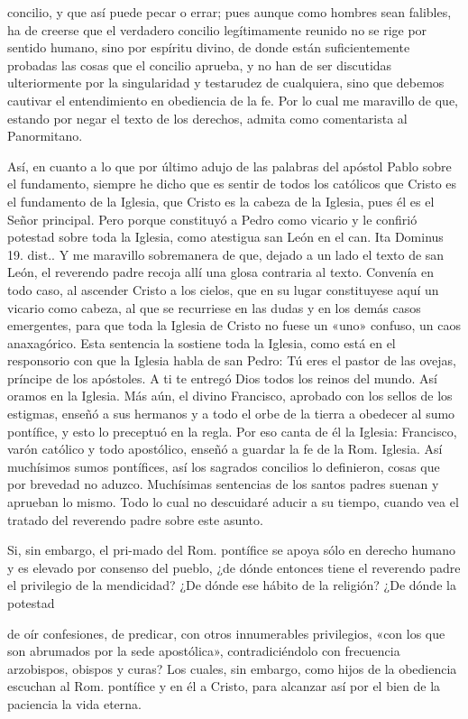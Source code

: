 concilio, y que así puede pecar o errar; pues aunque como hombres sean falibles, ha de creerse que el verdadero concilio legítimamente reunido no se rige por sentido humano, sino por espíritu divino, de donde están suficientemente probadas las cosas que el concilio aprueba, y no han de ser discutidas ulteriormente por la singularidad y testarudez de cualquiera, sino que debemos cautivar el entendimiento en obediencia de la fe. Por lo cual me maravillo de que, estando por negar el texto de los derechos, admita como comentarista al Panormitano.

Así, en cuanto a lo que por último adujo de las palabras del apóstol Pablo sobre el fundamento, siempre he dicho que es sentir de todos los católicos que Cristo es el fundamento de la Iglesia, que Cristo es la cabeza de la Iglesia, pues él es el Señor principal. Pero porque constituyó a Pedro como vicario y le confirió potestad sobre toda la Iglesia, como atestigua san León en el can. Ita Dominus 19. dist.. Y me maravillo sobremanera de que, dejado a un lado el texto de san León, el reverendo padre recoja allí una glosa contraria al texto. Convenía en todo caso, al ascender Cristo a los cielos, que en su lugar constituyese aquí un vicario como cabeza, al que se recurriese en las dudas y en los demás casos emergentes, para que toda la Iglesia de Cristo no fuese un «uno» confuso, un caos anaxagórico. Esta sentencia la sostiene toda la Iglesia, como está en el responsorio con que la Iglesia habla de san Pedro: Tú eres el pastor de las ovejas, príncipe de los apóstoles. A ti te entregó Dios todos los reinos del mundo. Así oramos en la Iglesia. Más aún, el divino Francisco, aprobado con los sellos de los estigmas, enseñó a sus hermanos y a todo el orbe de la tierra a obedecer al sumo pontífice, y esto lo preceptuó en la regla. Por eso canta de él la Iglesia: Francisco, varón católico y todo apostólico, enseñó a guardar la fe de la Rom. Iglesia. Así muchísimos sumos pontífices, así los sagrados concilios lo definieron, cosas que por brevedad no aduzco. Muchísimas sentencias de los santos padres suenan y aprueban lo mismo. Todo lo cual no descuidaré aducir a su tiempo, cuando vea el tratado del reverendo padre sobre este asunto.

Si, sin embargo, el pri-\marginpar{\small[297]}mado del Rom. pontífice se apoya sólo en derecho humano y es elevado por consenso del pueblo, ¿de dónde entonces tiene el reverendo padre el privilegio de la mendicidad? ¿De dónde ese hábito de la religión? ¿De dónde la potestad

de oír confesiones, de predicar, con otros innumerables privilegios, «con los que son abrumados por la sede apostólica», contradiciéndolo con frecuencia arzobispos, obispos y curas? Los cuales, sin embargo, como hijos de la obediencia escuchan al Rom. pontífice y en él a Cristo, para alcanzar así por el bien de la paciencia la vida eterna.

